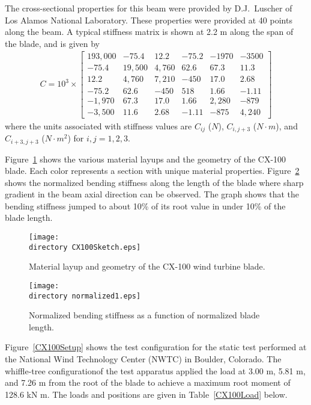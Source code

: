 \documentclass{aiaa-tc}
\def\directory{EPSF/}
\begin{document}
The cross-sectional properties for this beam were provided by D.J.\ Luscher of Los Alamos National Laboratory. These properties were provided at 40 points along the beam. A typical stiffness matrix is shown at 2.2 m along the span of the blade, and is given by
\begin{align*}
C =10^3 \times \begin{bmatrix}
	193,000 & -75.4   & 12.2   & -75.2  & -1970    & -3500    \\
	-75.4  & 19,500 & 4,760   & 62.6  & 67.3    & 11.3    \\
	12.2  & 4,760   & 7,210 & -450  & 17.0    & 2.68    \\
	-75.2  & 62.6   & -450   & 518 & 1.66    & -1.11    \\
	-1,970  & 67.3   & 17.0   & 1.66  & 2,280 & -879    \\
	-3,500  & 11.6   & 2.68   & -1.11  & -875    & 4,240
\end{bmatrix}
\end{align*}
where the units associated with stiffness values are $C_{ij}$ ($N$), $C_{i,j+3}$ ($N \cdot m$), and $C_{i+3,j+3}$ ($N \cdot m^2$) for $i,j = 1,2,3$.

Figure~\ref{CX100Sketch} shows the various material layups and the geometry of the CX-100 blade. Each color represents a section with unique material properties. Figure~\ref{normalized1} shows the normalized bending stiffness along the length of the blade where sharp gradient in the beam axial direction can be observed. The graph shows that the bending stiffness jumped to about 10\% of its root value in under 10\% of the blade length.

\begin{figure}
\centering
\texttt{[image: \\directory CX100Sketch.eps]}
\caption{Material layup and geometry of the CX-100 wind turbine blade\cite{paquette2006modeling}.} 
\label{CX100Sketch}
\end{figure}

\begin{figure}
\centering
\texttt{[image: \\directory normalized1.eps]}
\caption{Normalized bending stiffness as a function of normalized blade length.} 
\label{normalized1}
\end{figure}

Figure~\ref{CX100Setup} shows the test configuration for the static test performed at the National Wind Technology Center (NWTC) in Boulder, Colorado. The whiffle-tree configurationof the test apparatus applied the load at 3.00 m, 5.81 m, and 7.26 m from the root of the blade to achieve a maximum root moment of 128.6 kN m. The loads and positions are given in Table~\ref{CX100Load} below.
\end{document}
